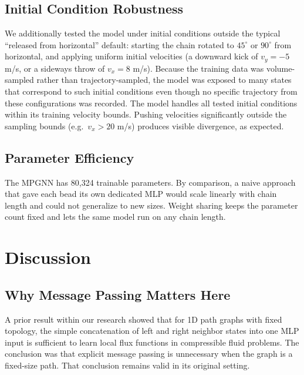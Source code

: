\documentclass[conference]{IEEEtran}
\begin{document}
\subsection{Initial Condition Robustness}

We additionally tested the model under initial conditions outside the typical ``released from horizontal'' default: starting the chain rotated to $45^\circ$ or $90^\circ$ from horizontal, and applying uniform initial velocities (a downward kick of $v_y = -5$ m/s, or a sideways throw of $v_x = 8$ m/s). Because the training data was volume-sampled rather than trajectory-sampled, the model was exposed to many states that correspond to such initial conditions even though no specific trajectory from these configurations was recorded. The model handles all tested initial conditions within its training velocity bounds. Pushing velocities significantly outside the sampling bounds (e.g.\ $v_x > 20$ m/s) produces visible divergence, as expected.

\subsection{Parameter Efficiency}

The MPGNN has 80{,}324 trainable parameters. By comparison, a naive approach that gave each bead its own dedicated MLP would scale linearly with chain length and could not generalize to new sizes. Weight sharing keeps the parameter count fixed and lets the same model run on any chain length.

\section{Discussion}

\subsection{Why Message Passing Matters Here}

A prior result within our research showed that for 1D path graphs with fixed topology, the simple concatenation of left and right neighbor states into one MLP input is sufficient to learn local flux functions in compressible fluid problems. The conclusion was that explicit message passing is unnecessary when the graph is a fixed-size path. That conclusion remains valid in its original setting.
\end{document}
